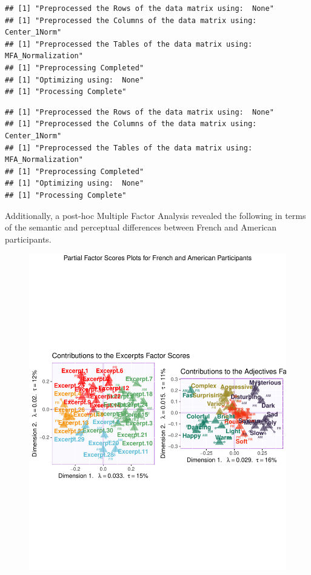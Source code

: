 \documentclass[
  english,
  man,floatsintext]{apa6}
\begin{document}
\begin{verbatim}
## [1] "Preprocessed the Rows of the data matrix using:  None"
## [1] "Preprocessed the Columns of the data matrix using:  Center_1Norm"
## [1] "Preprocessed the Tables of the data matrix using:  MFA_Normalization"
## [1] "Preprocessing Completed"
## [1] "Optimizing using:  None"
## [1] "Processing Complete"
\end{verbatim}

\begin{verbatim}
## [1] "Preprocessed the Rows of the data matrix using:  None"
## [1] "Preprocessed the Columns of the data matrix using:  Center_1Norm"
## [1] "Preprocessed the Tables of the data matrix using:  MFA_Normalization"
## [1] "Preprocessing Completed"
## [1] "Optimizing using:  None"
## [1] "Processing Complete"
\end{verbatim}

Additionally, a post-hoc Multiple Factor Analysis revealed the following in terms of the semantic and perceptual differences between French and American participants.

\begin{figure}

{\centering \includegraphics{Music-Descriptor-Space_files/figure-latex/mfasbs-1} 

}

\caption{ }\label{fig:mfasbs}
\end{figure}
\end{document}
